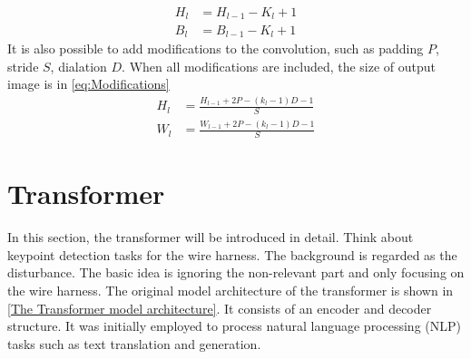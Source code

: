   \begin{equation}
  \begin{aligned}
    H_{l}&=H_{l-1}-K_{l}+1\\
    B_{l}&=B_{l-1}-K_{l}+1
      \label{eq:CNN size change}
  \end{aligned}
  \end{equation}
  It is also possible to add modifications to the convolution, such as padding $P$, stride $S$, dialation $D$. When all modifications are included, the size of output image is in \autoref{eq:Modifications} 
  \begin{equation}
  \begin{aligned}
    H_{l}&=\frac{H_{l-1}+2P-(k_{l}-1)D-1}{S}\\
    W_{l}&=\frac{W_{l-1}+2P-(k_{l}-1)D-1}{S}
      \label{eq:Modifications}
  \end{aligned}
  \end{equation}
\section{Transformer}
  In this section, the transformer will be introduced in detail. Think about keypoint detection tasks for the wire harness. The background is regarded as 
  the disturbance. The basic idea is ignoring the non-relevant part and only focusing on the wire harness. 
  The original model architecture of the transformer is shown in \autoref{The Transformer model architecture}. It consists of an encoder and decoder structure. 
  It was initially employed to process natural language processing (NLP) tasks such as text translation and generation. 
